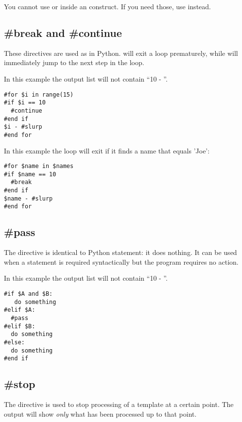 You cannot use  or  inside an 
construct.  If you need those, use  instead.

\subsection{\#break and \#continue}
\label{flowControl.break}

These directives are used as in Python.  will
exit a  loop prematurely, while  will immediately
jump to the next step in the  loop.

In this example the output list will not contain ``10 - ''. 
\begin{verbatim}
#for $i in range(15)
#if $i == 10
  #continue
#end if
$i - #slurp
#end for
\end{verbatim}

In this example the loop will exit if it finds a name that equals 'Joe':
\begin{verbatim}
#for $name in $names
#if $name == 10
  #break
#end if
$name - #slurp
#end for
\end{verbatim}


\subsection{\#pass}
\label{flowControl.break}

The  directive is identical to Python  statement: it
does nothing. It can be used when a statement is required syntactically but the
program requires no action.

In this example the output list will not contain ``10 - ''. 
\begin{verbatim}
#if $A and $B:
   do something
#elif $A:
  #pass
#elif $B: 
  do something
#else:
  do something
#end if
\end{verbatim}

\subsection{\#stop}
\label{flowControl.stop}

The  directive is used to stop processing of a template at a
certain point.  The output will show {\em only} what has been processed up to
that point.  

